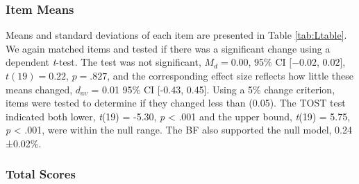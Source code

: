 \documentclass[english,man, mask]{apa6}
\theoremstyle{definition}
\theoremstyle{definition}
\theoremstyle{definition}
\theoremstyle{remark}
\begin{document}
\subsubsection{Item Means}\label{item-means-1}

Means and standard deviations of each item are presented in Table
\ref{tab:Ltable}. We again matched items and tested if there was a
significant change using a dependent \emph{t}-test. The test was not
significant, \(M_d = 0.00\), 95\% CI \([-0.02\), \(0.02]\),
\(t(19) = 0.22\), \(p = .827\), and the corresponding effect size
reflects how little these means changed, \(d_{av}\) = 0.01 95\% CI
{[}-0.43, 0.45{]}. Using a 5\% change criterion, items were tested to
determine if they changed less than (0.05). The TOST test indicated both
lower, \emph{t}(19) = -5.30, \emph{p} \textless{} .001 and the upper
bound, \emph{t}(19) = 5.75, \emph{p} \textless{} .001, were within the
null range. The BF also supported the null model, 0.24 ±0.02\%.

\subsubsection{Total Scores}\label{total-scores-1}
\end{document}
